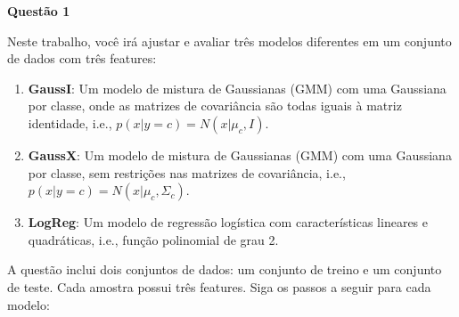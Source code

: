\textbf{Questão 1}

Neste trabalho, você irá ajustar e avaliar três modelos diferentes em um conjunto de dados com três features:

\begin{enumerate}
    \item \textbf{GaussI}: Um modelo de mistura de Gaussianas (GMM) com uma Gaussiana por classe, onde as matrizes de covariância são todas iguais à matriz identidade, i.e., \( p(x|y = c) = N(x|\mu_c, I) \).
    
    \item \textbf{GaussX}: Um modelo de mistura de Gaussianas (GMM) com uma Gaussiana por classe, sem restrições nas matrizes de covariância, i.e., \( p(x|y = c) = N(x|\mu_c, \Sigma_c) \).
    
    \item \textbf{LogReg}: Um modelo de regressão logística com características lineares e quadráticas, i.e., função polinomial de grau 2.
\end{enumerate}

A questão inclui dois conjuntos de dados: um conjunto de treino e um conjunto de teste. Cada amostra possui três features. Siga os passos a seguir para cada modelo:


